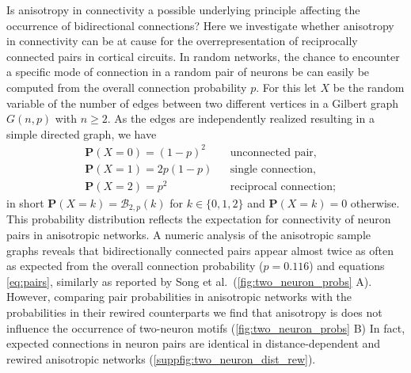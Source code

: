 Is anisotropy in connectivity a possible underlying principle
affecting the occurrence of bidirectional connections?  Here we
investigate whether anisotropy in connectivity can be at cause for the
overrepresentation of reciprocally connected pairs in cortical
circuits.  In random networks, the chance to encounter a specific mode
of connection in a random pair of neurons be can easily be computed
from the overall connection probability $p$. For this let $X$ be the
random variable of the number of edges between two different vertices
in a Gilbert graph $G(n,p)$ with $n \ge 2$. As the edges are
independently realized resulting in a simple directed graph, we have
\begin{equation}
  \label{eq:pairs}
  \begin{aligned}%
    & \mathbf{P}(X=0) = (1-p)^2   &&\text{unconnected pair,}  \\
    & \mathbf{P}(X=1)= 2p(1-p)    &&\text{single connection,}\\
    & \mathbf{P}(X=2) = p^2       &&\text{reciprocal connection};
  \end{aligned}%
\end{equation}
in short $\mathbf{P}(X=k) = \mathcal{B}_{2,p}(k)$ for $k \in
\{0,1,2\}$ and $\mathbf{P}(X=k) = 0$ otherwise. This probability
distribution reflects the expectation for connectivity of neuron pairs
in anisotropic networks. A numeric analysis of the anisotropic sample
graphs reveals that bidirectionally connected pairs appear almost
twice as often as expected from the overall connection
probability ($p=0.116$) and equations \ref{eq:pairs}, similarly as
reported by Song et al.~(\autoref{fig:two_neuron_probs} A). However,
comparing pair probabilities in anisotropic networks with the
probabilities in their rewired counterparts we find that anisotropy is
does not influence the occurrence of two-neuron motifs
(\autoref{fig:two_neuron_probs} B) In fact, expected connections in
neuron pairs are identical in distance-dependent and rewired
anisotropic networks (\autoref{suppfig:two_neuron_dist_rew}).

